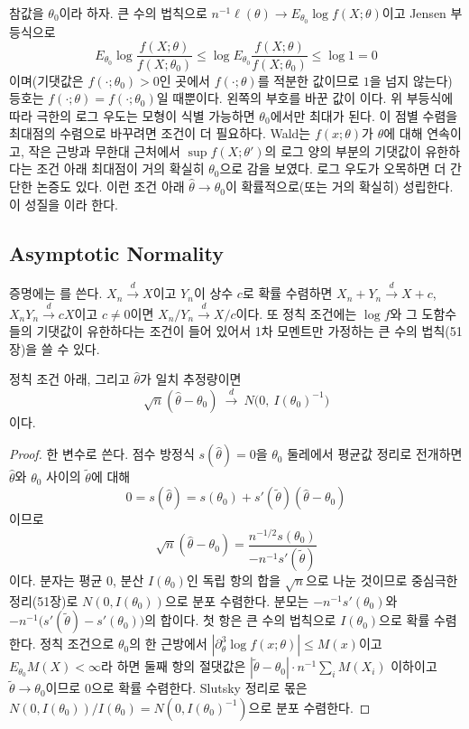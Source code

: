 참값을 $\theta_0$이라 하자. 큰 수의 법칙으로 $n^{-1}\ell(\theta)\to E_{\theta_0}\log f(X;\theta)$이고 Jensen 부등식으로
\[
E_{\theta_0}\log\frac{f(X;\theta)}{f(X;\theta_0)}\le\log E_{\theta_0}\frac{f(X;\theta)}{f(X;\theta_0)}\le\log1=0
\]
이며(기댓값은 $f(\cdot;\theta_0)>0$인 곳에서 $f(\cdot;\theta)$를 적분한 값이므로 $1$을 넘지 않는다) 등호는 $f(\cdot;\theta)=f(\cdot;\theta_0)$일 때뿐이다. 왼쪽의 부호를 바꾼 값이 이다. 위 부등식에 따라 극한의 로그 우도는 모형이 식별 가능하면 $\theta_0$에서만 최대가 된다. 이 점별 수렴을 최대점의 수렴으로 바꾸려면 조건이 더 필요하다. Wald는 $f(x;\theta)$가 $\theta$에 대해 연속이고, 작은 근방과 무한대 근처에서 $\sup f(X;\theta')$의 로그 양의 부분의 기댓값이 유한하다는 조건 아래 최대점이 거의 확실히 $\theta_0$으로 감을 보였다\cite{wald1949}. 로그 우도가 오목하면 더 간단한 논증도 있다. 이런 조건 아래 $\hat\theta\to\theta_0$이 확률적으로(또는 거의 확실히) 성립한다. 이 성질을 이라 한다.

\subsection{Asymptotic Normality}

증명에는 를 쓴다. $X_n\xrightarrow{d}X$이고 $Y_n$이 상수 $c$로 확률 수렴하면 $X_n+Y_n\xrightarrow{d}X+c$, $X_nY_n\xrightarrow{d}cX$이고 $c\ne0$이면 $X_n/Y_n\xrightarrow{d}X/c$이다. 또 정칙 조건에는 $\log f$와 그 도함수들의 기댓값이 유한하다는 조건이 들어 있어서 1차 모멘트만 가정하는 큰 수의 법칙(51장)을 쓸 수 있다.

\begin{theorem}
\label{thm:mle-normal}
정칙 조건 아래, 그리고 $\hat\theta$가 일치 추정량이면
\[
\sqrt n(\hat\theta-\theta_0)\ \xrightarrow{\ d\ }\ N\bigl(0,\ I(\theta_0)^{-1}\bigr)
\]
이다.
\end{theorem}

\begin{proof}
한 변수로 쓴다. 점수 방정식 $s(\hat\theta)=0$을 $\theta_0$ 둘레에서 평균값 정리로 전개하면 $\hat\theta$와 $\theta_0$ 사이의 $\tilde\theta$에 대해
\[
0=s(\hat\theta)=s(\theta_0)+s'(\tilde\theta)(\hat\theta-\theta_0)
\]
이므로
\[
\sqrt n(\hat\theta-\theta_0)=\frac{n^{-1/2}s(\theta_0)}{-n^{-1}s'(\tilde\theta)}
\]
이다. 분자는 평균 $0$, 분산 $I(\theta_0)$인 독립 항의 합을 $\sqrt n$으로 나눈 것이므로 중심극한정리(51장)로 $N(0,I(\theta_0))$으로 분포 수렴한다. 분모는 $-n^{-1}s'(\theta_0)$와 $-n^{-1}\bigl(s'(\tilde\theta)-s'(\theta_0)\bigr)$의 합이다. 첫 항은 큰 수의 법칙으로 $I(\theta_0)$으로 확률 수렴한다. 정칙 조건으로 $\theta_0$의 한 근방에서 $|\partial^3_\theta\log f(x;\theta)|\le M(x)$이고 $E_{\theta_0}M(X)<\infty$라 하면 둘째 항의 절댓값은 $|\tilde\theta-\theta_0|\cdot n^{-1}\sum_iM(X_i)$ 이하이고 $\tilde\theta\to\theta_0$이므로 $0$으로 확률 수렴한다. Slutsky 정리로 몫은 $N(0,I(\theta_0))/I(\theta_0)=N(0,I(\theta_0)^{-1})$으로 분포 수렴한다.
\end{proof}

